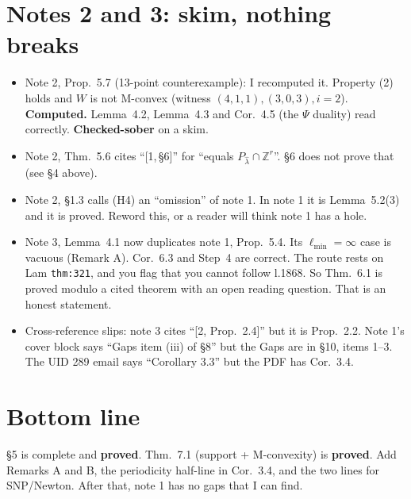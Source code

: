 \documentclass[11pt]{article}
\newcommand{\lh}{\hat\lambda}
\begin{document}
\section{Notes 2 and 3: skim, nothing breaks}
\begin{itemize}[leftmargin=1.2em]
\item Note 2, Prop.~5.7 (13-point counterexample): I recomputed it. Property (2) holds and $W$ is not
  M-convex (witness $(4,1,1),(3,0,3),i=2$). \textbf{Computed.} Lemma~4.2,
  Lemma~4.3 and Cor.~4.5 (the $\Psi$ duality) read correctly. \textbf{Checked-sober} on a skim.
\item Note 2, Thm.~5.6 cites ``[1,\,\S6]'' for ``equals $P_{\lh}\cap\mathbb Z^r$''. \S6 does
  not prove that (see \S4 above).
\item Note 2, \S1.3 calls (H4) an ``omission'' of note 1. In note 1 it is Lemma~5.2(3) and it is proved.
  Reword this, or a reader will think note 1 has a hole.
\item Note 3, Lemma~4.1 now duplicates note 1, Prop.~5.4. Its $\ell_{\min}=\infty$ case is
  vacuous (Remark A). Cor.~6.3 and Step~4 are correct. The route rests on Lam
  \texttt{thm:321}, and you flag that you cannot follow l.1868. So Thm.~6.1 is proved
  modulo a cited theorem with an open reading question. That is an honest statement.
\item Cross-reference slips: note 3 cites ``[2, Prop.~2.4]'' but it is Prop.~2.2. Note 1's cover
  block says ``Gaps item (iii) of \S8'' but the Gaps are in \S10, items 1--3. The UID 289 email says
  ``Corollary 3.3'' but the PDF has Cor.~3.4.
\end{itemize}

\section*{Bottom line}
\S5 is complete and \textbf{proved}. Thm.~7.1 (support + M-convexity) is \textbf{proved}.
Add Remarks A and B, the periodicity half-line in Cor.~3.4, and the two lines for
SNP/Newton. After that, note 1 has no gaps that I can find.
\end{document}

